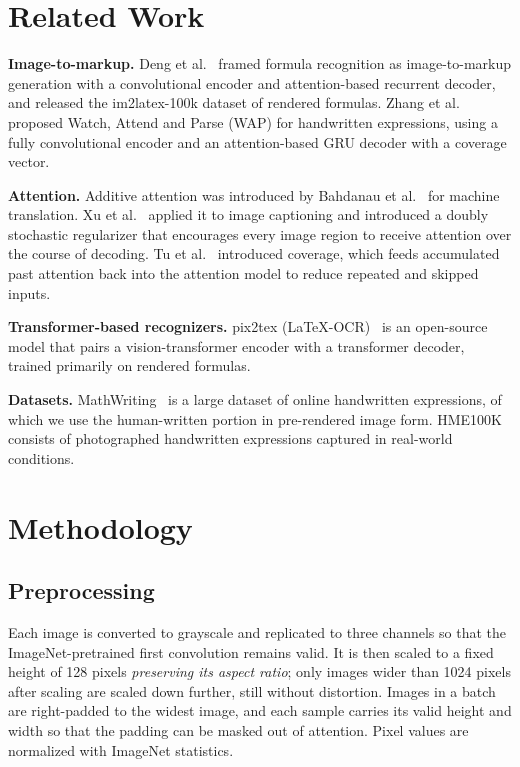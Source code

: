 \documentclass[conference]{IEEEtran}
\begin{document}
\section{Related Work}
\textbf{Image-to-markup.} Deng et al.~\cite{deng2017im2markup} framed formula recognition as image-to-markup generation with a convolutional encoder and attention-based recurrent decoder, and released the im2latex-100k dataset of rendered formulas. Zhang et al.~\cite{zhang2017wap} proposed Watch, Attend and Parse (WAP) for handwritten expressions, using a fully convolutional encoder and an attention-based GRU decoder with a coverage vector.

\textbf{Attention.} Additive attention was introduced by Bahdanau et al.~\cite{bahdanau2015} for machine translation. Xu et al.~\cite{xu2015show} applied it to image captioning and introduced a doubly stochastic regularizer that encourages every image region to receive attention over the course of decoding. Tu et al.~\cite{tu2016coverage} introduced coverage, which feeds accumulated past attention back into the attention model to reduce repeated and skipped inputs.

\textbf{Transformer-based recognizers.} pix2tex (LaTeX-OCR)~\cite{pix2tex} is an open-source model that pairs a vision-transformer encoder with a transformer decoder, trained primarily on rendered formulas.

\textbf{Datasets.} MathWriting~\cite{mathwriting} is a large dataset of online handwritten expressions, of which we use the human-written portion in pre-rendered image form. HME100K~\cite{hme100k} consists of photographed handwritten expressions captured in real-world conditions.

\section{Methodology}\label{sec:method}

\subsection{Preprocessing}
Each image is converted to grayscale and replicated to three channels so that the ImageNet-pretrained first convolution remains valid. It is then scaled to a fixed height of 128 pixels \emph{preserving its aspect ratio}; only images wider than 1024 pixels after scaling are scaled down further, still without distortion. Images in a batch are right-padded to the widest image, and each sample carries its valid height and width so that the padding can be masked out of attention. Pixel values are normalized with ImageNet statistics.
\end{document}
